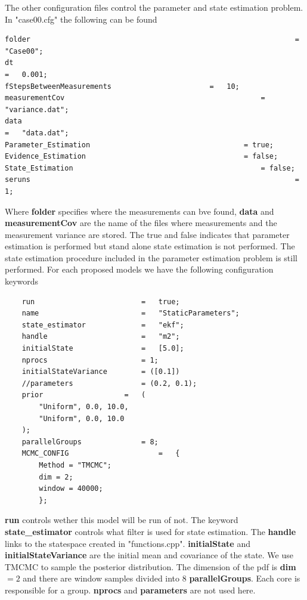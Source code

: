 \documentclass[]{elsarticle}
\begin{document}
The other configuration files control the parameter and state estimation problem. In "case00.cfg" the following can be found
\begin{verbatim}
folder																=	"Case00";
dt																		=	0.001;
fStepsBetweenMeasurements 						=	10;
measurementCov												=	"variance.dat";
data																	=	"data.dat";
Parameter_Estimation 									= true;
Evidence_Estimation 									= false;
State_Estimation											= false;
seruns 																= 1;
\end{verbatim}
Where {\bf folder} specifies where the measurements can bve found, {\bf data} and { \bf measurementCov} are the name of the files where measurements and the measurement variance are stored.  The true and false indicates that parameter estimation is performed but stand alone state estimation is not performed. The state estimation procedure included in the parameter estimation problem is still performed. For each proposed models we have the following configuration keywords

\begin{verbatim}
	run							=	true;
	name 						=	"StaticParameters";
	state_estimator				=	"ekf";
	handle 						=	"m2";
	initialState 				=	[5.0];
	nprocs						= 1;
	initialStateVariance 		= ([0.1])
	//parameters 				= (0.2, 0.1);
	prior					= 	(
		"Uniform", 0.0, 10.0,
		"Uniform", 0.0, 10.0
	);
	parallelGroups				= 8;
	MCMC_CONFIG						=	{
		Method = "TMCMC";
		dim = 2;
		window = 40000;
		};
\end{verbatim}

{\bf run} controls wether this model will be run of not. The keyword {\bf state\_estimator} controls what filter is used for state estimation. The {\bf handle} links to the statespace created in "functions.cpp". {\bf initialState} and {\bf initialStateVariance} are the initial mean and covariance of the state. We use TMCMC to sample the posterior distribution. The dimension of the pdf is {\bf dim} $=2$ and there are window samples divided into 8 {\bf parallelGroups}. Each core is responsible for a group. {\bf nprocs} and {\bf parameters} are not used here.
\end{document}

